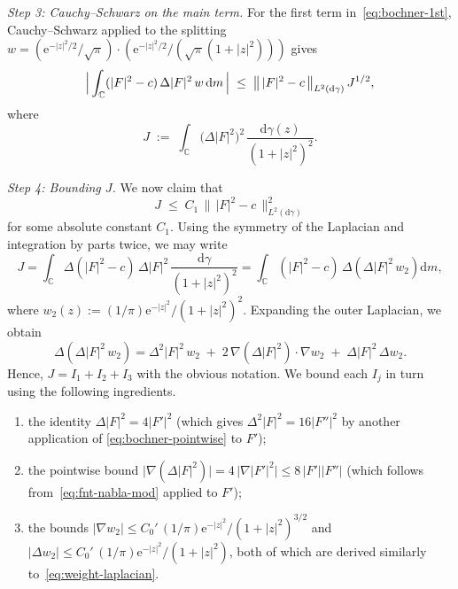 \documentclass[11pt]{amsart}
\theoremstyle{remark}
\newcommand{\C}{\mathbb{C}}
\newcommand{\abs}[1]{\lvert #1 \rvert}
\newcommand{\dd}{\mathrm{d}}
\newcommand{\ee}{\mathrm{e}}
\begin{document}
\medskip
\noindent\emph{Step 3: Cauchy--Schwarz on the main term.}\;
For the first term in~\eqref{eq:bochner-1st}, Cauchy--Schwarz applied
to the splitting $w = (\ee^{-\abs{z}^2/2}/\sqrt{\pi}) \cdot
(\ee^{-\abs{z}^2/2}/(\sqrt{\pi}(1+\abs{z}^2)))$ gives
\begin{equation}\label{eq:bochner-CS}
\Bigl|\,\int_{\C} (\abs{F}^2-c)\, \Delta\abs{F}^2\, w\, \dd m \,\Bigr|
\;\le\;
\bigl\|\,\abs{F}^2 - c\,\bigr\|_{L^2(\dd\gamma)}\, J^{1/2},
\end{equation}
where
\begin{equation}\label{eq:J-def}
J \;:=\; \int_{\C} \bigl(\Delta\abs{F}^2\bigr)^2\,
\frac{\dd\gamma(z)}{(1+\abs{z}^2)^2}.
\end{equation}

\medskip
\noindent\emph{Step 4: Bounding $J$.}\;
We now claim that
\begin{equation}\label{eq:J-bound}
J \;\le\; C_1\, \bigl\|\,\abs{F}^2 - c\,\bigr\|_{L^2(\dd\gamma)}^2
\end{equation}
for some absolute constant $C_1$. Using the symmetry of the
Laplacian and integration by parts twice, we may write
\[
J
= \int_{\C} \Delta(\abs{F}^2 - c)\, \Delta\abs{F}^2\,
\frac{\dd\gamma}{(1+\abs{z}^2)^2}
= \int_{\C} (\abs{F}^2 - c)\,
\Delta\!\left(\Delta\abs{F}^2\, w_2\right) \dd m,
\]
where $w_2(z) := (1/\pi)\ee^{-\abs{z}^2}/(1+\abs{z}^2)^2$. Expanding the
outer Laplacian, we obtain
\[
\Delta\!\left(\Delta\abs{F}^2\, w_2\right)
= \Delta^2\abs{F}^2\, w_2
\;+\; 2\, \nabla(\Delta\abs{F}^2) \cdot \nabla w_2
\;+\; \Delta\abs{F}^2\, \Delta w_2.
\]
Hence, $J = I_1 + I_2 + I_3$ with the obvious notation. We bound each
$I_j$ in turn using the following ingredients.
\begin{enumerate}[leftmargin=2em]
    \item[(i)] the identity $\Delta\abs{F}^2 = 4\abs{F'}^2$ (which gives
    $\Delta^2\abs{F}^2 = 16\abs{F''}^2$ by another application of
    \eqref{eq:bochner-pointwise} to $F'$);
    \item[(ii)] the pointwise bound $\bigl|\nabla(\Delta\abs{F}^2)\bigr|
    = 4\,\abs{\nabla\abs{F'}^2} \le 8\,\abs{F'}\abs{F''}$
    (which follows from~\eqref{eq:fnt-nabla-mod} applied to $F'$);
    \item[(iii)] the bounds $\abs{\nabla w_2} \le C_0'\,
    (1/\pi)\ee^{-\abs{z}^2}/(1+\abs{z}^2)^{3/2}$ and
    $\abs{\Delta w_2} \le C_0'\,
    (1/\pi)\ee^{-\abs{z}^2}/(1+\abs{z}^2)$, both of which are derived
    similarly to~\eqref{eq:weight-laplacian}.
\end{enumerate}
\end{document}
